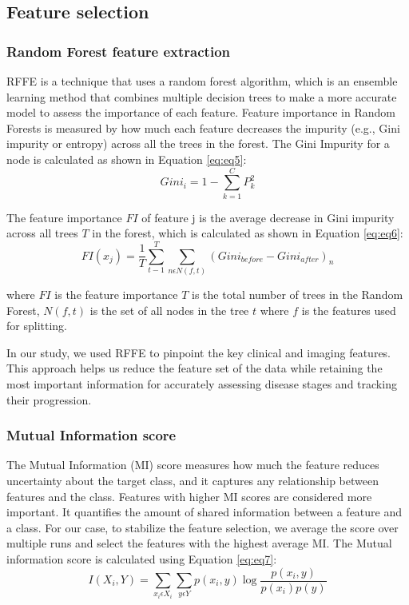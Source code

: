 \documentclass{article}
\begin{document}
\subsection{Feature selection}
\subsubsection{Random Forest feature extraction}

RFFE is a technique that uses a random forest algorithm, which is an ensemble learning method that combines multiple decision trees to make a more accurate model to assess the importance of each feature. Feature importance in Random Forests is measured by how much each feature decreases the impurity (e.g., Gini impurity or entropy) across all the trees in the forest. The Gini Impurity for a node is calculated as shown in Equation \eqref{eq:eq5}:
\begin{equation}
    Gini_i = 1 - \sum_{k=1}^{C}P_k^2
    \label{eq:eq5}
\end{equation}

The feature importance $FI$ of feature j is the average decrease in Gini impurity across all trees $T$ in the forest, which is calculated as shown in Equation \eqref{eq:eq6}:
\begin{equation}
    FI(x_j) = \frac{1}{T}\sum_{t-1}^{T}\sum_{n\epsilon N(f,t)}(Gini_{before} - Gini_{after})_n
    \label{eq:eq6}
\end{equation}

where $FI$ is the feature importance $T$ is the total number of trees in the Random Forest, $N(f,t)$ is the set of all nodes in the tree $t$ where $f$ is the features used for splitting.

In our study, we used RFFE to pinpoint the key clinical and imaging features. This approach helps us reduce the feature set of the data while retaining the most important information for accurately assessing disease stages and tracking their progression.

\subsubsection{Mutual Information score}

The Mutual Information (MI) score measures how much the feature reduces uncertainty about the target class, and it captures any relationship between features and the class. Features with higher MI scores are considered more important. It quantifies the amount of shared information between a feature and a class. For our case, to stabilize the feature selection, we average the score over multiple runs and select the features with the highest average MI. The Mutual information score is calculated using Equation \eqref{eq:eq7}:
\begin{equation}
    I(X_i, Y) = \sum_{x_i\epsilon X_i}\sum_{y\epsilon Y}p(x_i, y)\log\frac{p(x_i, y)}{p(x_i)p(y)}
    \label{eq:eq7}
\end{equation}
\end{document}
